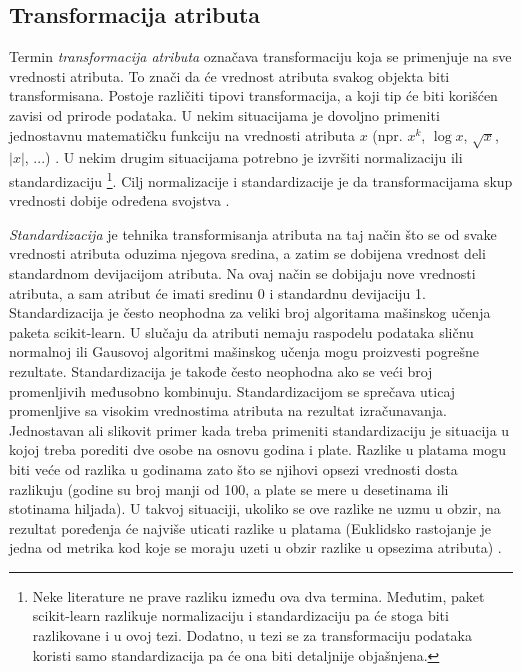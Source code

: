 \documentclass[12pt,oneside]{memoir}
\begin{document}
\subsection{Transformacija atributa}

Termin \textit{transformacija atributa} označava transformaciju koja se primenjuje na sve vrednosti atributa. To znači da će vrednost atributa svakog objekta biti transformisana. Postoje različiti tipovi transformacija, a koji tip će biti korišćen zavisi od prirode podataka. U nekim situacijama je dovoljno primeniti jednostavnu matematičku funkciju na vrednosti atributa $x$ (npr. $x^k$, $\log x$, $\sqrt{x}$, $\left| x \right|$, ...) . U nekim drugim situacijama potrebno je izvršiti normalizaciju ili standardizaciju \footnote{Neke literature ne prave razliku između ova dva termina. Međutim, paket scikit-learn razlikuje normalizaciju i standardizaciju pa će stoga biti razlikovane i u ovoj tezi. Dodatno, u tezi se za transformaciju podataka koristi samo standardizacija pa će ona biti detaljnije objašnjena.}. Cilj normalizacije i standardizacije je da transformacijama skup vrednosti dobije određena svojstva \cite{mitic}.  

\textit{Standardizacija} je tehnika transformisanja atributa na taj način što se od svake vrednosti atributa oduzima njegova sredina, a zatim se dobijena vrednost deli standardnom devijacijom atributa. Na ovaj način se dobijaju nove vrednosti atributa, a sam atribut će imati sredinu 0 i standardnu devijaciju 1. Standardizacija je često neophodna za veliki broj algoritama mašinskog učenja paketa scikit-learn. U slučaju da atributi nemaju raspodelu podataka sličnu normalnoj ili Gausovoj algoritmi mašinskog učenja mogu proizvesti pogrešne rezultate. Standardizacija je takođe često neophodna ako se veći broj promenljivih međusobno kombinuju. Standardizacijom se sprečava uticaj promenljive sa visokim vrednostima atributa na rezultat izračunavanja. Jednostavan ali slikovit primer kada treba primeniti standardizaciju je situacija u kojoj treba porediti dve osobe na osnovu godina i plate. Razlike u platama mogu biti veće od razlika u godinama zato što se njihovi opsezi vrednosti dosta razlikuju (godine su broj manji od 100, a plate se mere u desetinama ili stotinama hiljada). U takvoj situaciji, ukoliko se ove razlike ne uzmu u obzir, na rezultat poređenja će najviše uticati razlike u platama (Euklidsko rastojanje je jedna od metrika kod koje se moraju uzeti u obzir razlike u opsezima atributa) \cite{ sklearn_preprocessing, mlm2, mitic}. 
\end{document}
